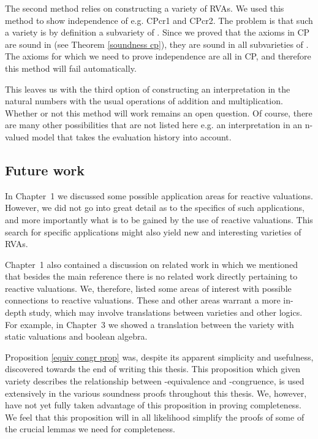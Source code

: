 \documentclass[a4paper,twoside,openright]{report}
\begin{document}
The second method relies on constructing a variety of RVAs. We used this method to show independence of e.g. CPcr1 and CPcr2. The problem is that such a variety is by definition a subvariety of . Since we proved that the axioms in CP are sound in  (see Theorem \ref{soundness cp}), they are sound in all subvarieties of . The axioms for which we need to prove independence are all in CP, and therefore this method will fail automatically.

This leaves us with the third option of constructing an interpretation in the natural numbers with the usual operations of addition and multiplication. Whether or not this method will work remains an open question. Of course, there are many other possibilities that are not listed here e.g. an interpretation in an n-valued model that takes the evaluation history into account.

\subsection{Future work}
In Chapter~1 we discussed some possible application areas for reactive valuations. However, we did not go into great detail as to the specifics of such applications, and more importantly what is to be gained by the use of reactive valuations. This search for specific applications might also yield new and interesting varieties of RVAs. 

Chapter~1 also contained a discussion on related work in which we mentioned that besides the main reference \cite{main} there is no related work directly pertaining to reactive valuations. We, therefore, listed some areas of interest with possible connections to reactive valuations. These and other areas warrant a more in-depth study, which may involve translations between varieties and other logics. For example, in Chapter~3 we showed a translation between the variety with static valuations and boolean algebra.

Proposition \ref{equiv congr prop} was, despite its apparent simplicity and usefulness, discovered towards the end of writing this thesis. This proposition which given variety  describes the relationship between -equivalence and -congruence, is used extensively in the various soundness proofs throughout this thesis. We, however, have not yet fully taken advantage of this proposition in proving completeness. We feel that this proposition will in all likelihood simplify the proofs of some of the crucial lemmas we need for completeness.
\end{document}
